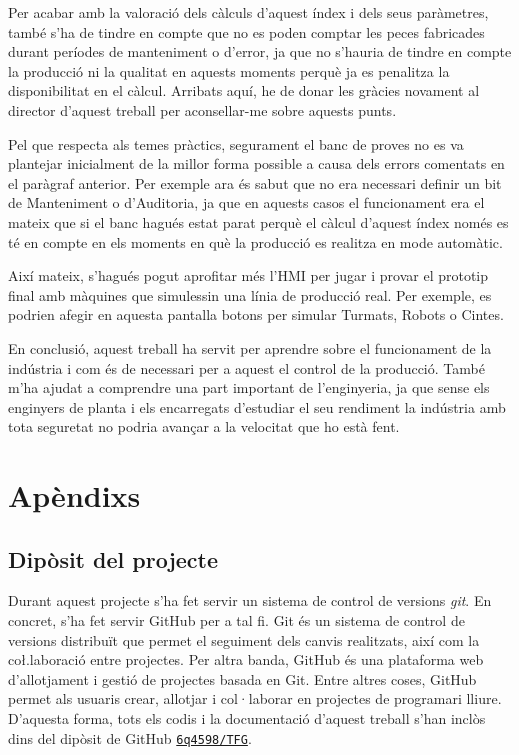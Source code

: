 \documentclass{tfgitic}[2022/06/30]
\begin{document}
Per acabar amb la valoració dels càlculs d'aquest índex i dels seus paràmetres, també s'ha de tindre en compte que no es poden comptar les peces fabricades durant períodes de manteniment o d'error, ja que no s'hauria de tindre en compte la producció ni la qualitat en aquests moments perquè ja es penalitza la disponibilitat en el càlcul. Arribats aquí, he de donar les gràcies novament al director d'aquest treball per aconsellar-me sobre aquests punts.

Pel que respecta als temes pràctics, segurament el banc de proves no es va plantejar inicialment de la millor forma possible a causa dels errors comentats en el paràgraf anterior. Per exemple ara és sabut que no era necessari definir un bit de Manteniment o d'Auditoria, ja que en aquests casos el funcionament era el mateix que si el banc hagués estat parat perquè el càlcul d'aquest índex només es té en compte en els moments en què la producció es realitza en mode automàtic.

Així mateix, s'hagués pogut aprofitar més l'HMI per jugar i provar el prototip final amb màquines que simulessin una línia de producció real. Per exemple, es podrien afegir en aquesta pantalla botons per simular Turmats, Robots o Cintes.


En conclusió, aquest treball ha servit per aprendre sobre el funcionament de la indústria i com és de necessari per a aquest el control de la producció. També m'ha ajudat a comprendre una part important de l'enginyeria, ja que sense els enginyers de planta i els encarregats d'estudiar el seu rendiment la indústria amb tota seguretat no podria avançar a la velocitat que ho està fent.

\printbibliography

\appendix
\part{Apèndixs}


\chapter{Dipòsit del projecte}
\label{anex: repo}
Durant aquest projecte s'ha fet servir un sistema de control de versions \emph{git}. En concret, s'ha fet servir GitHub per a tal fi.  Git és un sistema de control de versions distribuït que permet el seguiment dels canvis realitzats, així com la co\l.laboració entre projectes. Per altra banda, GitHub és una plataforma web d'allotjament i gestió de projectes basada en Git. Entre altres coses, GitHub permet als usuaris crear, allotjar i col·laborar en projectes de programari lliure. D'aquesta forma, tots els codis i la documentació d'aquest treball s'han inclòs dins del dipòsit de GitHub \texttt{\href{https://github.com/6q4598/TFG}{6q4598/TFG}}.
\end{document}
